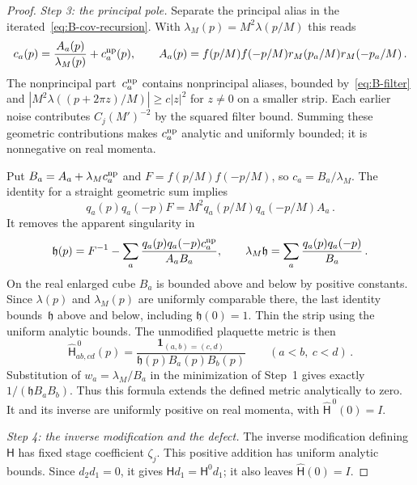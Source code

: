 \begin{proof}
\emph{Step 3: the principal pole.} Separate the principal alias in the iterated~\eqref{eq:B-cov-recursion}. With $\lambda_M(p)=M^2\lambda(p/M)$ this reads
\begin{equation*}
c_a(p)=\frac{A_a(p)}{\lambda_M(p)}+c^{\rm np}_a(p),\qquad
A_a(p)=f(p/M)f(-p/M)r_M(p_a/M)r_M(-p_a/M)\,.
\end{equation*}
The nonprincipal part~$c^{\rm np}_a$ contains nonprincipal aliases, bounded by~\eqref{eq:B-filter} and $|M^2\lambda((p+2\pi z)/M)|\ge c|z|^2$ for $z\ne0$ on a smaller strip. Each earlier noise contributes $C_j(M')^{-2}$ by the squared filter bound. Summing these geometric contributions makes $c^{\rm np}_a$ analytic and uniformly bounded; it is nonnegative on real momenta.

Put $B_a=A_a+\lambda_M c^{\rm np}_a$ and $F=f(p/M)f(-p/M)$, so $c_a=B_a/\lambda_M$. The identity for a straight geometric sum implies
\begin{equation*}
q_a(p)q_a(-p)F=M^2q_a(p/M)q_a(-p/M)A_a\,.
\end{equation*}
It removes the apparent singularity in
\begin{equation*}
\mathfrak h(p)=F^{-1}-\sum_a\frac{q_a(p)q_a(-p)c^{\rm np}_a}{A_aB_a},\qquad
\lambda_M\mathfrak h=\sum_a\frac{q_a(p)q_a(-p)}{B_a}\,.
\end{equation*}
On the real enlarged cube $B_a$ is bounded above and below by positive constants. Since $\lambda(p)$ and $\lambda_M(p)$ are uniformly comparable there, the last identity bounds~$\mathfrak h$ above and below, including $\mathfrak h(0)=1$. Thin the strip using the uniform analytic bounds. The unmodified plaquette metric is then
\begin{equation*}
\widehat{\mathsf H}^{\,0}_{ab,cd}(p)=\frac{\mathbf1_{(a,b)=(c,d)}}{\mathfrak h(p)B_a(p)B_b(p)}\qquad(a<b,\ c<d)\,.
\end{equation*}
Substitution of $w_a=\lambda_M/B_a$ in the minimization of Step~1 gives exactly $1/(\mathfrak h B_aB_b)$. Thus this formula extends the defined metric analytically to zero. It and its inverse are uniformly positive on real momenta, with $\widehat{\mathsf H}^{\,0}(0)=I$.

\emph{Step 4: the inverse modification and the defect.} The inverse modification defining $\mathsf H$ has fixed stage coefficient $\zeta_j$. This positive addition has uniform analytic bounds. Since $d_2d_1=0$, it gives $\mathsf H d_1=\mathsf H^0d_1$; it also leaves $\widehat{\mathsf H}(0)=I$.


\end{proof}
